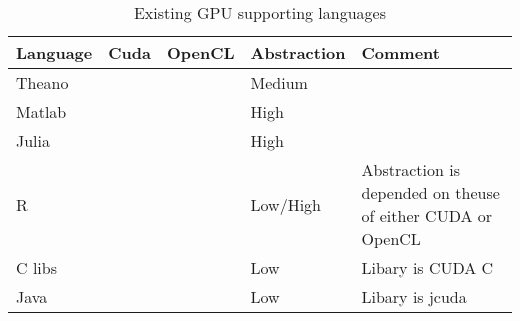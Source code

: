 \begin{table}
	\centering
	\begin{tabular}{|l|c|c|l|l|}
	\hline
	\textbf{Language} & \textbf{Cuda}         & \textbf{OpenCL} & \textbf{Abstraction} & \textbf{Comment}			  		\\ \hline
	Theano   & \cmark           & \cmark            & Medium      &                                                            \\ \hline
	Matlab   & \cmark           & \cmark            & High        &                                                            \\ \hline
	Julia    & \cmark           &               & High        &                                                            \\ \hline
	R        & \cmark           & \cmark            & Low/High    & Abstraction is depended on theuse of either CUDA or OpenCL \\ \hline
	C libs   & \cmark           & \cmark            & Low         & Libary is CUDA C                                           \\ \hline
	Java     & \cmark           &               &   Low          & Libary is jcuda                                            \\ \hline
	\end{tabular}
	\caption{Existing GPU supporting languages}
	\label{gpu-pls}
\end{table}
